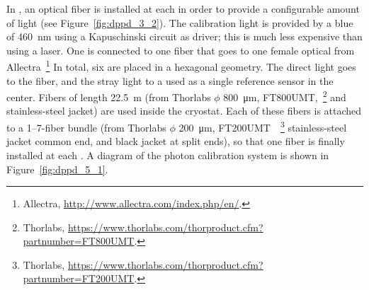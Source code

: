 In , an optical fiber is installed at each  in order to provide a configurable amount of light (see Figure~\ref{fig:dppd_3_2}). The calibration light is provided by a blue   of \SI{460}{nm} using a Kapuschinski circuit as   driver; this is much less expensive than using a laser.
One  is connected to one fiber that goes to one female optical \fdth from Allectra~\footnote{Allectra\texttrademark{}, \url{http://www.allectra.com/index.php/en/}.} %
In total,  six   are placed in a hexagonal geometry. The direct light goes to the fiber, and the stray light to a  used as a single reference sensor %
in the center. Fibers of length \SI{22.5}{m} (from Thorlabs $\phi$ \SI{800}{\micro\meter}, FT800UMT,~\footnote{Thorlabs\texttrademark{}, \url{https://www.thorlabs.com/thorproduct.cfm?partnumber=FT800UMT}.} %
 and stainless-steel jacket) are used inside the cryostat. Each of these fibers is attached to a \numrange{1}{7}-fiber bundle (from Thorlabs $\phi$ \SI{200}{\micro\meter}, FT200UMT~~\footnote{Thorlabs\texttrademark{}, \url{https://www.thorlabs.com/thorproduct.cfm?partnumber=FT200UMT}.} %
 stainless-steel jacket common end, and black jacket at split ends), so that one fiber is finally installed at each . A diagram of the  photon calibration system is shown in Figure~\ref{fig:dppd_5_1}. %

